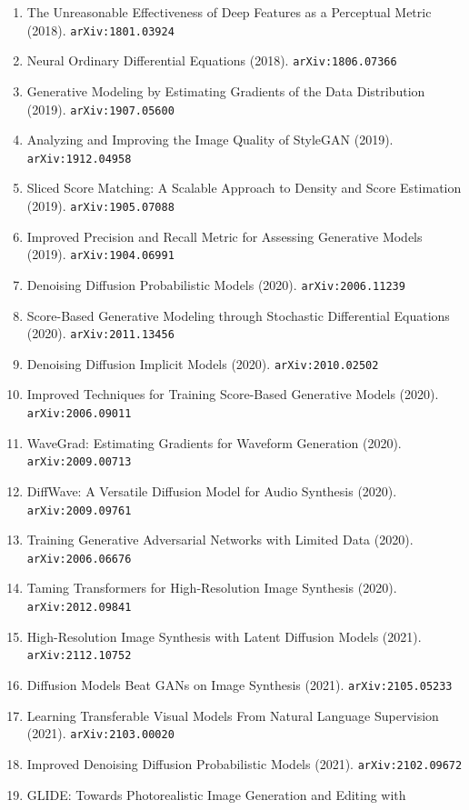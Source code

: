 \documentclass[11pt]{article}
\begin{document}
\begin{enumerate}
  \item The Unreasonable Effectiveness of Deep Features as a Perceptual Metric (2018). \texttt{arXiv:1801.03924}
  \item Neural Ordinary Differential Equations (2018). \texttt{arXiv:1806.07366}
  \item Generative Modeling by Estimating Gradients of the Data Distribution (2019). \texttt{arXiv:1907.05600}
  \item Analyzing and Improving the Image Quality of StyleGAN (2019). \texttt{arXiv:1912.04958}
  \item Sliced Score Matching: A Scalable Approach to Density and Score
  Estimation (2019). \texttt{arXiv:1905.07088}
  \item Improved Precision and Recall Metric for Assessing Generative Models (2019). \texttt{arXiv:1904.06991}
  \item Denoising Diffusion Probabilistic Models (2020). \texttt{arXiv:2006.11239}
  \item Score-Based Generative Modeling through Stochastic Differential
  Equations (2020). \texttt{arXiv:2011.13456}
  \item Denoising Diffusion Implicit Models (2020). \texttt{arXiv:2010.02502}
  \item Improved Techniques for Training Score-Based Generative Models (2020). \texttt{arXiv:2006.09011}
  \item WaveGrad: Estimating Gradients for Waveform Generation (2020). \texttt{arXiv:2009.00713}
  \item DiffWave: A Versatile Diffusion Model for Audio Synthesis (2020). \texttt{arXiv:2009.09761}
  \item Training Generative Adversarial Networks with Limited Data (2020). \texttt{arXiv:2006.06676}
  \item Taming Transformers for High-Resolution Image Synthesis (2020). \texttt{arXiv:2012.09841}
  \item High-Resolution Image Synthesis with Latent Diffusion Models (2021). \texttt{arXiv:2112.10752}
  \item Diffusion Models Beat GANs on Image Synthesis (2021). \texttt{arXiv:2105.05233}
  \item Learning Transferable Visual Models From Natural Language Supervision (2021). \texttt{arXiv:2103.00020}
  \item Improved Denoising Diffusion Probabilistic Models (2021). \texttt{arXiv:2102.09672}
  \item GLIDE: Towards Photorealistic Image Generation and Editing with

\end{enumerate}
\end{document}
